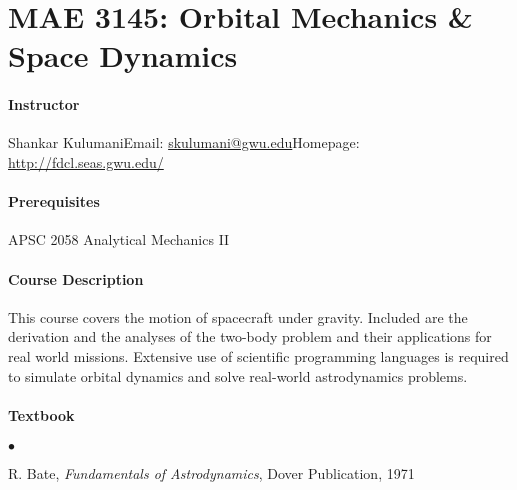 \documentclass[10pt]{article}
\date{}
\begin{document}
\pagestyle{empty}
\section*{MAE 3145: Orbital Mechanics \& Space Dynamics}
\vspace*{-0.4cm}


\paragraph*{Instructor}
Shankar Kulumani\quad Email: \href{mailto:skulumani@gwu.edu}{skulumani@gwu.edu}\quad Homepage: \url{http://fdcl.seas.gwu.edu/}\\

\paragraph*{Prerequisites} APSC 2058 Analytical Mechanics II

\paragraph*{Course Description} This course covers the motion of spacecraft under gravity. Included are the derivation and the analyses of the two-body problem and their applications for real world missions.
Extensive use of scientific programming languages is required to simulate orbital dynamics and solve real-world astrodynamics problems.

\paragraph*{Textbook}
\begin{list}{$\bullet$}{\setlength{\itemsep}{-3pt}}
\item R. Bate, \textit{Fundamentals of Astrodynamics}, Dover Publication, 1971
\end{list}
\end{document}
